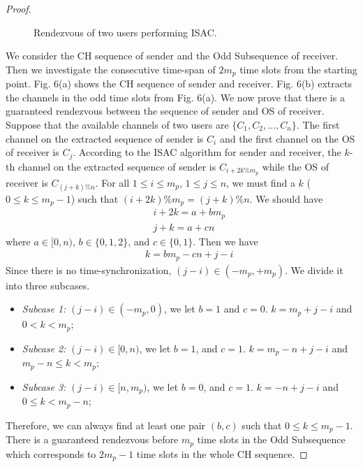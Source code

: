 \documentclass[journal]{IEEEtran}
\begin{document}
\begin{proof}
\begin{figure*}
\centering
{}
\hspace{1in}
\caption{Rendezvous of two users performing ISAC.}
\end{figure*}
We consider the CH sequence of sender and the Odd Subsequence of receiver. Then we investigate the consecutive time-span of $2m_p$ time slots from the starting point. Fig. 6(a) shows the CH sequence of sender and receiver. Fig. 6(b) extracts the channels in the odd time slots from Fig. 6(a). We now prove that there is a guaranteed rendezvous between the sequence of sender and OS of receiver. Suppose that the available channels of two users are $\{C_1, C_2, ..., C_n\}$. The first channel on the extracted sequence of sender is $C_i$ and the first channel on the OS of receiver is $C_j$. According to the ISAC algorithm for sender and receiver, the $k\text{-}$th channel on the extracted sequence of sender is $C_{i+2k\%m_p}$ while the OS of receiver is $C_{(j+k)\%n}$. For all $1\leq i\leq m_p$, $1\leq j\leq n$, we must find a $k$ ($0\leq k\leq m_p-1$) such that $(i+2k)\%m_p=(j+k)\%n$. We should have
\begin{eqnarray}
&&i+2k=a+bm_p\\
&&j+k=a+cn
\end{eqnarray}
where $a\in[0, n)$, $b\in\{0, 1, 2\}$, and $c\in\{0, 1\}$. Then we have
\begin{eqnarray}
&&k=bm_p-cn+j-i
\end{eqnarray}
Since there is no time-synchronization, $(j-i)\in(-m_p,+m_p)$. We divide it into three subcases.
\begin{itemize}
\item \emph{Subcase 1:} $(j-i)\in(-m_p, 0)$, we let $b=1$ and $c=0$. $k=m_p+j-i$ and $0<k<m_p$;
\item \emph{Subcase 2:} $(j-i)\in[0, n)$, we let $b=1$, and $c=1$. $k=m_p-n+j-i$ and $m_p-n\leq k<m_p$;
\item \emph{Subcase 3:} $(j-i)\in[n, m_p)$, we let $b=0$, and $c=1$. $k=-n+j-i$ and $0\leq k<m_p-n$;
\end{itemize}
Therefore, we can always find at least one pair $(b, c)$ such that $0\leq k\leq m_p-1$. There is a guaranteed rendezvous before $m_p$ time slots in the Odd Subsequence which corresponds to $2m_p-1$ time slots in the whole CH sequence.
\end{proof}
\end{document}
